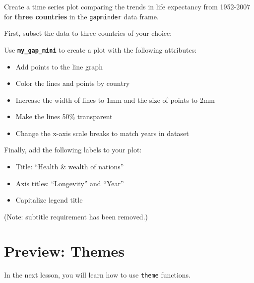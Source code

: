 \documentclass[
  letterpaper,
  DIV=11,
  numbers=noendperiod]{scrreprt}
\begin{document}
\begin{tcolorbox}[enhanced jigsaw, colframe=quarto-callout-tip-color-frame, colbacktitle=quarto-callout-tip-color!10!white, titlerule=0mm, opacitybacktitle=0.6, breakable, toprule=.15mm, arc=.35mm, rightrule=.15mm, colback=white, bottomrule=.15mm, opacityback=0, toptitle=1mm, left=2mm, bottomtitle=1mm, title=\textcolor{quarto-callout-tip-color}{\faLightbulb}\hspace{0.5em}{Practice}, leftrule=.75mm, coltitle=black]

Create a time series plot comparing the trends in life expectancy from
1952-2007 for \textbf{three countries} in the \texttt{gapminder} data
frame.

First, subset the data to three countries of your choice:

Use \textbf{\texttt{my\_gap\_mini}} to create a plot with the following
attributes:

\begin{itemize}
\item
  Add points to the line graph
\item
  Color the lines and points by country
\item
  Increase the width of lines to 1mm and the size of points to 2mm
\item
  Make the lines 50\% transparent
\item
  Change the x-axis scale breaks to match years in dataset
\end{itemize}

Finally, add the following labels to your plot:

\begin{itemize}
\item
  Title: ``Health \& wealth of nations''
\item
  Axis titles: ``Longevity'' and ``Year''
\item
  Capitalize legend title
\end{itemize}

(Note: subtitle requirement has been removed.)

\end{tcolorbox}

\hypertarget{preview-themes}{%
\section{Preview: Themes}\label{preview-themes}}

In the next lesson, you will learn how to use \texttt{theme} functions.
\end{document}
